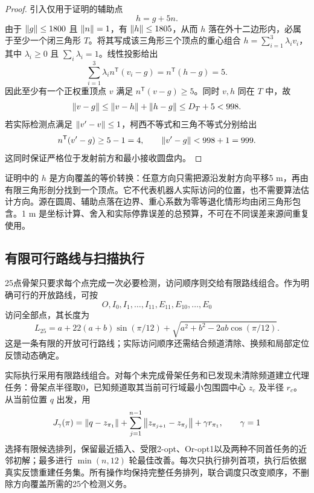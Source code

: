 \begin{proof}
引入仅用于证明的辅助点
\begin{equation}
 h=g+5n.
 \label{q4:eq-helper}
\end{equation}
由于 $\left\lVert g\right\rVert\le1800$ 且 $\left\lVert n\right\rVert=1$，有 $\left\lVert h\right\rVert\le1805$，从而 $h$ 落在外十二边形内，必属于至少一个闭三角形 $T$。将其写成该三角形三个顶点的重心组合 $h=\sum_{i=1}^3\lambda_i v_i$，其中 $\lambda_i\ge0$ 且 $\sum_i\lambda_i=1$。线性投影给出
\begin{equation}
 \sum_{i=1}^3\lambda_i n^{\mathsf T}(v_i-g)
 =n^{\mathsf T}(h-g)=5.
 \label{q4:eq-projection}
\end{equation}
因此至少有一个正权重顶点 $v$ 满足 $n^{\mathsf T}(v-g)\ge5$。同时 $v,h$ 同在 $T$ 中，故
\begin{equation}
 \left\lVert v-g\right\rVert\le \left\lVert v-h\right\rVert+\left\lVert h-g\right\rVert\le D_T+5<998.
 \label{q4:eq-distance}
\end{equation}
若实际检测点满足 $\left\lVert v'-v\right\rVert\le1$，柯西不等式和三角不等式分别给出
\[
 n^{\mathsf T}(v'-g)\ge5-1=4,
 \qquad \left\lVert v'-g\right\rVert<998+1=999.
\]
这同时保证严格位于发射前方和最小接收圆盘内。\end{proof}

证明中的 $h$ 是方向覆盖的等价转换：任意方向只需把源沿发射方向平移5 m，再由有限三角形剖分找到一个顶点。它不代表机器人实际访问的位置，也不需要算法估计方向。源在圆周、辅助点落在边界、重心系数为零等退化情形均由闭三角形包含。1 m 是坐标计算、舍入和实际停靠误差的总预算，不可在不同误差来源间重复使用。

\subsection{有限可行路线与扫描执行}

25点骨架只要求每个点完成一次必要检测，访问顺序则交给有限路线组合。作为明确可行的开放路线，可按
\[
 O,I_0,I_1,\ldots,I_{11},E_{11},E_{10},\ldots,E_0
\]
访问全部点，其长度为
\begin{equation}
 L_{25}=a+22(a+b)\sin(\pi/12)
 +\sqrt{a^2+b^2-2ab\cos(\pi/12)}.
 \label{q4:eq-route}
\end{equation}
这是一条有限的开放可行路线；实际访问顺序还需结合频道清除、换频和局部定位反馈动态确定。

实际执行采用有限路线组合。对每个未完成骨架任务和已发现未清除频道建立代理任务：骨架点半径取0，已知频道取其当前可行域最小包围圆中心 $z_c$ 及半径 $r_c$。从当前位置 $q$ 出发，用
\begin{equation}
 J_\gamma(\pi)=\left\lVert q-z_{\pi_1}\right\rVert+
 \sum_{j=1}^{n-1}\left\lVert z_{\pi_{j+1}}-z_{\pi_j}\right\rVert
 +\gamma r_{\pi_1},\qquad \gamma=1
 \label{q4:eq-route-proxy}
\end{equation}
选择有限候选排列，保留最近插入、受限2-opt、Or-opt1以及两种不同首任务的近邻初解；最多进行 $\min(n,12)$ 轮最佳改善。每次只执行排列首项，执行后依据真实反馈重建任务集。所有操作均保持完整任务排列，联合调度只改变顺序，不删除方向覆盖所需的25个检测义务。

